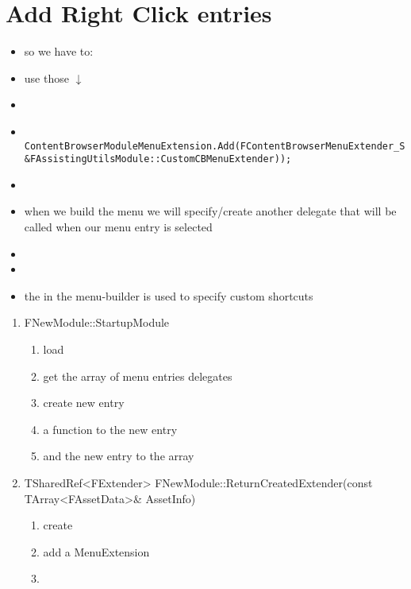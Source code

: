     \section{Add Right Click entries}
        \begin{itemize}
            \item so we have to:
            \item {} use those $\downarrow$
            \item {} 
            \item 
            \begin{lstlisting}
                ContentBrowserModuleMenuExtension.Add(FContentBrowserMenuExtender_SelectedPaths::CreateRaw(this, &FAssistingUtilsModule::CustomCBMenuExtender));
            \end{lstlisting}
            \item 
            \item when we build the menu we will specify/create another delegate that will be called when our menu entry is selected
            \item {}
            \item 
            \item the  in the menu-builder is used to specify custom shortcuts
        \end{itemize}
        
        \begin{enumerate}
            \item FNewModule::StartupModule
            \begin{enumerate}
                \item load 
                \item get the array of menu entries delegates
                \item create new entry
                \item {} a function to the new entry
                \item and  the new entry to the array
            \end{enumerate}
            \item TSharedRef<FExtender> FNewModule::ReturnCreatedExtender(const TArray<FAssetData>\& AssetInfo)
            \begin{enumerate}
                \item create 
                \item add a MenuExtension
                \item 
            \end{enumerate}
        \end{enumerate}

